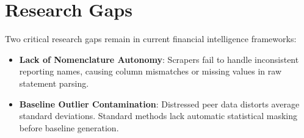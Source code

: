 \section{Research Gaps}
Two critical research gaps remain in current financial intelligence frameworks:
\begin{itemize}
    \setlength{\itemsep}{2pt}
    \setlength{\parskip}{0pt}
    \setlength{\parsep}{0pt}
    \item \textbf{Lack of Nomenclature Autonomy}: Scrapers fail to handle inconsistent reporting names, causing column mismatches or missing values in raw statement parsing.
    \item \textbf{Baseline Outlier Contamination}: Distressed peer data distorts average standard deviations. Standard methods lack automatic statistical masking before baseline generation.
\end{itemize}
